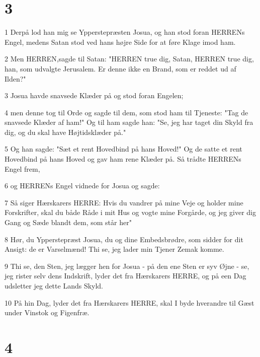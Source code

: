 \chapter{3}

\par 1 Derpå lod han mig se Ypperstepræsten Josua, og han stod foran HERRENs Engel, medens Satan stod ved hans højre Side for at føre Klage imod ham.
\par 2 Men HERREN,sagde til Satan: "HERREN true dig, Satan, HERREN true dig, han, som udvalgte Jerusalem. Er denne ikke en Brand, som er reddet ud af Ilden?"
\par 3 Josua havde snavsede Klæder på og stod foran Engelen;
\par 4 men denne tog til Orde og sagde til dem, som stod ham til Tjeneste: "Tag de snavsede Klæder af ham!" Og til ham sagde han: "Se, jeg har taget din Skyld fra dig, og du skal have Højtidsklæder på."
\par 5 Og han sagde: "Sæt et rent Hovedbind på hans Hoved!" Og de satte et rent Hovedbind på hans Hoved og gav ham rene Klæder på. Så trådte HERRENs Engel frem,
\par 6 og HERRENs Engel vidnede for Josua og sagde:
\par 7 Så siger Hærskarers HERRE: Hvis du vandrer på mine Veje og holder mine Forskrifter, skal du både Råde i mit Hus og vogte mine Forgårde, og jeg giver dig Gang og Sæde blandt dem, som står her"
\par 8 Hør, du Ypperstepræst Josua, du og dine Embedsbrødre, som sidder for dit Ansigt: de er Varselmænd! Thi se, jeg lader min Tjener Zemak komme.
\par 9 Thi se, den Sten, jeg lægger hen for Josua - på den ene Sten er syv Øjne - se, jeg rister selv dens Indskrift, lyder det fra Hærskarers HERRE, og på een Dag udsletter jeg dette Lands Skyld.
\par 10 På hin Dag, lyder det fra Hærskarers HERRE, skal I byde hverandre til Gæst under Vinstok og Figenfræ.

\chapter{4}

